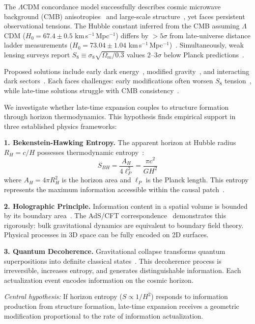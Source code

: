 \documentclass[twocolumn,superscriptaddress,prl,amsmath,amssymb]{revtex4-2}
\begin{document}
The $\Lambda$CDM concordance model successfully describes cosmic microwave background (CMB) anisotropies~\cite{PlanckCollaboration2020} and large-scale structure~\cite{DESI2024}, yet faces persistent observational tensions. The Hubble constant inferred from the CMB assuming $\Lambda$CDM ($H_0 = 67.4 \pm 0.5$ km\,s$^{-1}$\,Mpc$^{-1}$) differs by $>5\sigma$ from late-universe distance ladder measurements ($H_0 = 73.04 \pm 1.04$ km\,s$^{-1}$\,Mpc$^{-1}$)~\cite{Riess2022}. Simultaneously, weak lensing surveys report $S_8 \equiv \sigma_8\sqrt{\Omega_m/0.3}$ values 2--3$\sigma$ below Planck predictions~\cite{KiDS2020,DES2022}.

Proposed solutions include early dark energy~\cite{Kamionkowski2023}, modified gravity~\cite{Amendola2020}, and interacting dark sectors~\cite{DiValentino2021}. Each faces challenges: early modifications often worsen $S_8$ tension~\cite{Hill2020}, while late-time solutions struggle with CMB consistency~\cite{Knox2020}.

We investigate whether late-time expansion couples to structure formation through horizon thermodynamics. This hypothesis finds empirical support in three established physics frameworks:

\textbf{1. Bekenstein-Hawking Entropy.} The apparent horizon at Hubble radius $R_H = c/H$ possesses thermodynamic entropy~\cite{Bekenstein1973,Hawking1975}:
\begin{equation}
S_{BH} = \frac{A_H}{4\ell_P^2} = \frac{\pi c^2}{G H^2}
\label{eq:BH_entropy}
\end{equation}
where $A_H = 4\pi R_H^2$ is the horizon area and $\ell_P$ is the Planck length. This entropy represents the maximum information accessible within the causal patch~\cite{Bousso2002}.

\textbf{2. Holographic Principle.} Information content in a spatial volume is bounded by its boundary area~\cite{tHooft1993,Susskind1995}. The AdS/CFT correspondence~\cite{Maldacena1998} demonstrates this rigorously: bulk gravitational dynamics are equivalent to boundary field theory. Physical processes in 3D space can be fully encoded on 2D surfaces.

\textbf{3. Quantum Decoherence.} Gravitational collapse transforms quantum superpositions into definite classical states~\cite{Zurek2003}. This decoherence process is irreversible, increases entropy, and generates distinguishable information. Each actualization event encodes information on the cosmic horizon.

\textit{Central hypothesis:} If horizon entropy ($S \propto 1/H^2$) responds to information production from structure formation, late-time expansion receives a geometric modification proportional to the rate of information actualization.
\end{document}
